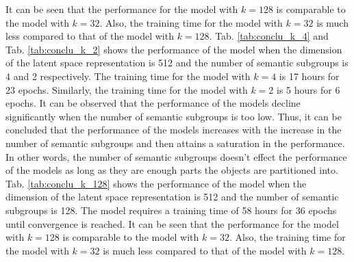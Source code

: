 It can be seen that the performance for the model with $k=128$ is comparable to the model with $k=32$. Also, the training time for the model with $k=32$ is much less compared to that of the model with $k=128$. Tab. \ref{tab:conclu_k_4} and Tab. \ref{tab:conclu_k_2} shows the performance of the model when the dimension of the latent space representation is 512 and the number of semantic subgroups is 4 and 2 respectively. The training time for the model with $k=4$ is 17 hours for 23 epochs. Similarly, the training time for the model with $k=2$ is 5 hours for 6 epochs. It can be observed that the performance of the models decline significantly when the number of semantic subgroups is too low. Thus, it can be concluded that the performance of the models increases with the increase in the number of semantic subgroups and then attains a saturation in the performance. In other words, the number of semantic subgroups doesn't effect the performance of the models as long as they are enough parts the objects are partitioned into. Tab. \ref{tab:conclu_k_128} shows the performance of the model when the dimension of the latent space representation is 512 and the number of semantic subgroups is 128. The model requires a training time of 58 hours for 36 epochs until convergence is reached. It can be seen that the performance for the model with $k=128$ is comparable to the model with $k=32$. Also, the training time for the model with $k=32$ is much less compared to that of the model with $k=128$. 


